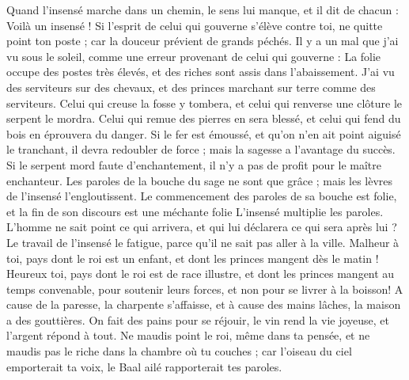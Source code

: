 \begin{multicols}{2}
Quand l’insensé marche dans un chemin, le sens lui manque, et il dit de chacun : Voilà un insensé !
Si l'esprit de celui qui gouverne s'élève contre toi, ne quitte point ton poste ; car la douceur prévient de grands péchés.
Il y a un mal que j'ai vu sous le soleil, comme une erreur provenant de celui qui gouverne :
La folie occupe des postes très élevés, et des riches sont assis dans l’abaissement.
J'ai vu des serviteurs sur des chevaux, et des princes marchant sur terre comme des serviteurs.
Celui qui creuse la fosse y tombera, et celui qui renverse une clôture le serpent le mordra.
Celui qui remue des pierres en sera blessé, et celui qui fend du bois en éprouvera du danger.
Si le fer est émoussé, et qu'on n'en ait point aiguisé le tranchant, il devra redoubler de force ; mais la sagesse a l’avantage du succès.
Si le serpent mord faute d’enchantement, il n’y a pas de profit pour le maître enchanteur.
Les paroles de la bouche du sage ne sont que grâce ; mais les lèvres de l’insensé l’engloutissent.
Le commencement des paroles de sa bouche est folie, et la fin de son discours est une méchante folie
L’insensé multiplie les paroles. L'homme ne sait point ce qui arrivera, et qui lui déclarera ce qui sera après lui ?
Le travail de l’insensé le fatigue, parce qu’il ne sait pas aller à la ville.
Malheur à toi, pays dont le roi est un enfant, et dont les princes mangent dès le matin !
Heureux toi, pays dont le roi est de race illustre, et dont les princes mangent au temps convenable, pour soutenir leurs forces, et non pour se livrer à la boisson!
A cause de la paresse, la charpente s'affaisse, et à cause des mains lâches, la maison a des gouttières.
On fait des pains pour se réjouir, le vin rend la vie joyeuse, et l'argent répond à tout.
Ne maudis point le roi, même dans ta pensée, et ne maudis pas le riche dans la chambre où tu couches ; car l’oiseau du ciel emporterait ta voix, le Baal ailé rapporterait tes paroles.

\end{multicols}

